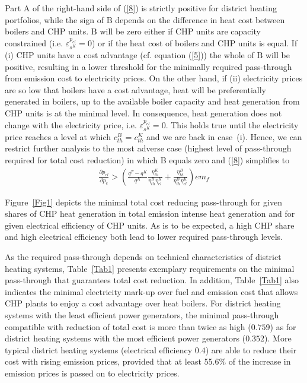 \documentclass[preprint, 12pt, authoryear]{elsarticle}
\begin{document}
Part $\text{A}$ of the right-hand side of (\ref{8}) is strictly positive for district heating portfolios, while the sign of $\text{B}$ depends on the difference in heat cost between boilers and CHP units.
$\text{B}$ will be zero either if CHP units are capacity constrained (i.e. $\varepsilon_{s^{K}}^{p_{el}} = 0$) or if the heat cost of boilers and CHP units is equal.
If (i) CHP units have a cost advantage (cf. equation (\ref{5})) the whole of $\text{B}$ will be positive, resulting in a lower threshold for the minimally required pass-through from  emission cost to electricity prices.
On the other hand, if (ii) electricity prices are so low that boilers have a cost advantage, heat will be preferentially generated in boilers, up to the available boiler capacity and heat generation from CHP units is at the minimal level.
In consequence, heat generation does not change with the electricity price, i.e. $\varepsilon_{s^K}^{p_{el}} = 0$.
This holds true until the electricity price reaches a level at which $c_{th}^{B} = c_{th}^{K}$ and we are back in case~(i).
Hence, we can restrict further analysis to the most adverse case (highest level of pass-through required for total cost reduction) in which B equals zero and (\ref{8}) simplifies to
\begin{align}\label{9}
\frac{\partial p_{el}}{\partial p_{e}} > \left( \frac{q^{T} - q^{K}}{q^{K}} \frac{\eta_{th}^{K}}{\eta_{th}^{B} \eta_{el}^{K}} + \frac{\eta_{th}^{B}}{\eta_{th}^{B} \eta_{el}^{K}} \right) em_{f}
\end{align}

Figure~\ref{Fig1} depicts the minimal total cost reducing pass-through for given shares of CHP heat generation in total emission intense heat generation and for given electrical efficiency of CHP units. 
As is to be expected, a high CHP share and high electrical efficiency both lead to lower required pass-through levels. 

As the required pass-through depends on technical characteristics of district heating systems, Table~\ref{Tab1} presents exemplary requirements on the minimal pass-through that guarantees total cost reduction.
In addition, Table~\ref{Tab1} also indicates the minimal electricity mark-up over fuel and emission cost that allows CHP plants to enjoy a cost advantage over heat boilers.
For district heating systems with the least efficient power generators, the minimal pass-through compatible with reduction of total cost is more than twice as high ($0.759$) as for district heating systems with the most efficient power generators ($0.352$).
More typical district heating systems (electrical efficiency $0.4$) are able to reduce their cost with rising emission prices, provided that at least 55.6\% of the increase in  emission prices is passed on to electricity prices.
\end{document}
